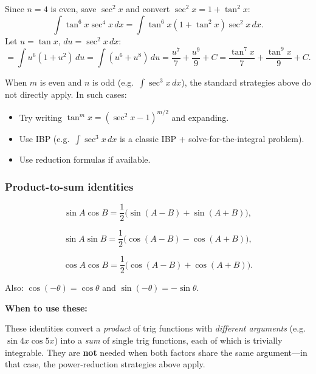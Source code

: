 \begin{examplebox}[title={Worked Example (Lecture Example 3.10): $\displaystyle \int \tan^6x\sec^4x\,dx$}]

Since $n=4$ is even, save $\sec^2x$ and convert $\sec^2x=1+\tan^2x$:
\[
\int \tan^6x\sec^4x\,dx = \int \tan^6x(1+\tan^2x)\sec^2x\,dx.
\]
Let $u=\tan x$, $du=\sec^2x\,dx$:
\[
= \int u^6(1+u^2)\,du = \int(u^6+u^8)\,du = \frac{u^7}{7}+\frac{u^9}{9}+C
= \frac{\tan^7x}{7}+\frac{\tan^9x}{9}+C.
\]

\end{examplebox}

\begin{examtip}[title={Exam Focus: What if neither $m$ is odd nor $n$ is even?}]
When $m$ is even and $n$ is odd (e.g.\ $\int \sec^3x\,dx$), the standard strategies above do not directly apply. In such cases:
\begin{itemize}[leftmargin=*]
\item Try writing $\tan^mx = (\sec^2x-1)^{m/2}$ and expanding.
\item Use IBP (e.g.\ $\int \sec^3x\,dx$ is a classic IBP + solve-for-the-integral problem).
\item Use reduction formulas if available.
\end{itemize}
\end{examtip}

\subsubsection*{Product-to-sum identities}

\begin{keyformula}[title={Key Formula: Product-to-sum identities}]

\[
\sin A\cos B=\frac12\big(\sin(A-B)+\sin(A+B)\big),
\]

\[
\sin A\sin B=\frac12\big(\cos(A-B)-\cos(A+B)\big),
\]

\[
\cos A\cos B=\frac12\big(\cos(A-B)+\cos(A+B)\big).
\]

Also: $\cos(-\theta)=\cos\theta$ and $\sin(-\theta)=-\sin\theta$.

\end{keyformula}

\textbf{When to use these:}

These identities convert a \emph{product} of trig functions with \emph{different arguments} (e.g.\ $\sin 4x\cos 5x$) into a \emph{sum} of single trig functions, each of which is trivially integrable. They are \textbf{not} needed when both factors share the same argument---in that case, the power-reduction strategies above apply.

